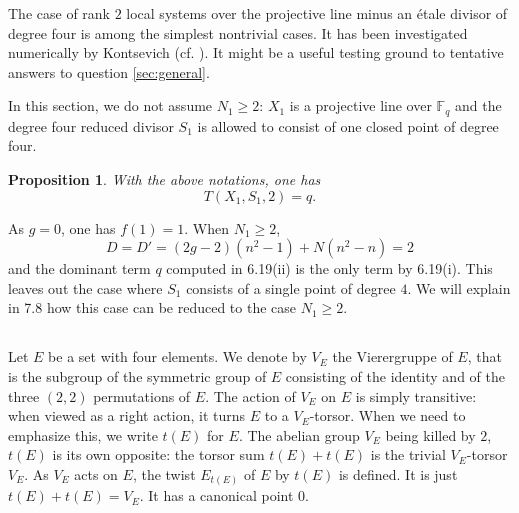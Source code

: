 \documentclass[11pt,a4paper]{article}
\theoremstyle{plain}
\newtheorem{proposition}[theorem]{Proposition}
\theoremstyle{definition}
\newcommand{\Fq}{\mathbb{F}_q}
\begin{document}
The case of rank $2$ local systems over the projective line minus an \'etale divisor of degree four is among the simplest nontrivial cases. It has been investigated numerically by Kontsevich (cf. \cite[0.1]{Ko}). It might be a useful testing ground to tentative answers to question \ref{sec:general}.

In this section, we do not assume $N_1 \geq 2$: $X_1$ is a projective line over $\Fq$ and the degree four reduced divisor $S_1$ is allowed to consist of one closed point of degree four.

\begin{proposition}
With the above notations, one has
\begin{equation}
T(X_1, S_1, 2) = q. \tag{7.1.1}
\end{equation}
\end{proposition}

As $g = 0$, one has $f(1) = 1$. When $N_1 \geq 2$,
\[
D = D' = (2g - 2)(n^2 - 1) + N(n^2 - n) = 2
\]
and the dominant term $q$ computed in 6.19(ii) is the only term by 6.19(i). This leaves out the case where $S_1$ consists of a single point of degree $4$. We will explain in 7.8 how this case can be reduced to the case $N_1 \geq 2$.

\subsection{}
Let $E$ be a set with four elements. We denote by $V_E$ the Vierergruppe of $E$, that is the subgroup of the symmetric group of $E$ consisting of the identity and of the three $(2,2)$ permutations of $E$. The action of $V_E$ on $E$ is simply transitive: when viewed as a right action, it turns $E$ to a $V_E$-torsor. When we need to emphasize this, we write $t(E)$ for $E$. The abelian group $V_E$ being killed by $2$, $t(E)$ is its own opposite: the torsor sum $t(E) + t(E)$ is the trivial $V_E$-torsor $V_E$. As $V_E$ acts on $E$, the twist $E_{t(E)}$ of $E$ by $t(E)$ is defined. It is just $t(E) + t(E) = V_E$. It has a canonical point $0$.
\end{document}
